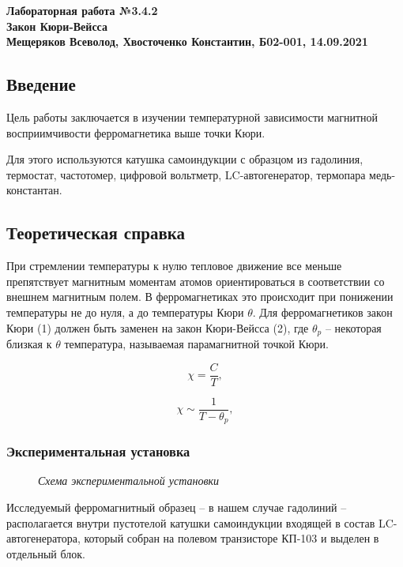\documentclass[a4paper, fontsize = 14pt]{article}
\begin{document}
\begin{center} \textbf{
Лабораторная работа №3.4.2 \\ Закон Кюри-Вейсса\\
Мещеряков Всеволод, Хвосточенко Константин, Б02-001, 14.09.2021}
\end{center} 

\subsection*{Введение}

Цель работы заключается в изучении температурной зависимости магнитной восприимчивости ферромагнетика выше точки Кюри.

Для этого используются катушка самоиндукции с образцом из гадолиния, термостат, частотомер, цифровой вольтметр, LC-автогенератор, термопара медь-константан.

\subsection*{Теоретическая справка}

При стремлении температуры к нулю тепловое движение все меньше препятствует магнитным моментам атомов ориентироваться в соответствии со внешнем магнитным полем. В ферромагнетиках это происходит при понижении температуры не до нуля, а до температуры Кюри $\theta$. Для ферромагнетиков закон Кюри (1) должен быть заменен на закон Кюри-Вейсса (2), где $\theta_p$ -- некоторая близкая к $\theta$ температура, называемая парамагнитной точкой Кюри. 

\begin{equation}
	\chi = \frac{C}{T},
\end{equation}

\begin{equation}
	\chi \sim \frac{1}{T - \theta_p},
\end{equation}

\subsubsection*{Экспериментальная установка}

\begin{figure}[hbt]\label{risI}
    \caption{\textit{Схема экспериментальной установки}}
\end{figure}

Исследуемый ферромагнитный образец -- в нашем случае гадолиний -- располагается внутри пустотелой катушки самоиндукции входящей в состав LC-автогенератора, который собран на полевом транзисторе КП-103 и выделен в отдельный блок. 
\end{document}
